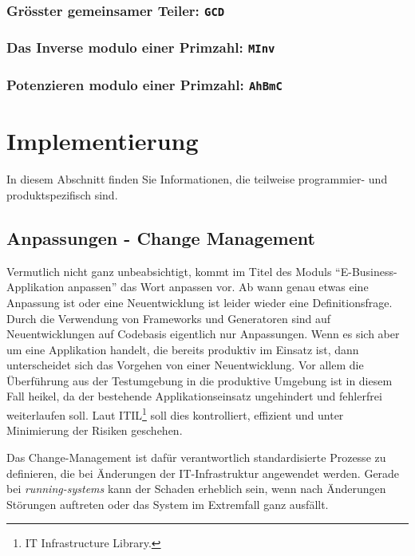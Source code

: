 \subsubsection*{Grösster gemeinsamer Teiler: \texttt{GCD}}
\subsubsection*{Das Inverse modulo einer Primzahl: \texttt{MInv}}
\subsubsection*{Potenzieren modulo einer Primzahl: \texttt{AhBmC}}

\section{Implementierung}
\label{sec:implementierung}

In diesem Abschnitt finden Sie Informationen, die teilweise programmier- und produktspezifisch sind.

\subsection{Anpassungen - Change Management}
\label{subsub:change-management}


Vermutlich nicht ganz unbeabsichtigt, kommt im Titel des Moduls ``E-Business-Applikation anpassen''
das Wort anpassen vor. Ab wann genau etwas eine Anpassung ist oder eine Neuentwicklung ist leider
wieder eine Definitionsfrage. Durch die Verwendung von Frameworks und Generatoren sind auf
Neuentwicklungen auf Codebasis eigentlich nur Anpassungen. Wenn es sich aber um eine Applikation
handelt, die bereits produktiv im Einsatz ist, dann unterscheidet sich das Vorgehen von einer
Neuentwicklung. Vor allem die Überführung aus der Testumgebung in die produktive Umgebung
ist in diesem Fall heikel, da der bestehende Applikationseinsatz ungehindert und fehlerfrei
weiterlaufen soll. Laut ITIL\footnote{IT Infrastructure Library.}
soll dies kontrolliert, effizient und unter Minimierung der Risiken geschehen.

Das Change-Management ist dafür verantwortlich standardisierte Prozesse zu definieren,
die bei Änderungen der IT-Infrastruktur angewendet werden. Gerade bei \emph{running-systems}
kann der Schaden erheblich sein, wenn nach Änderungen Störungen auftreten oder das System
im Extremfall ganz ausfällt.

